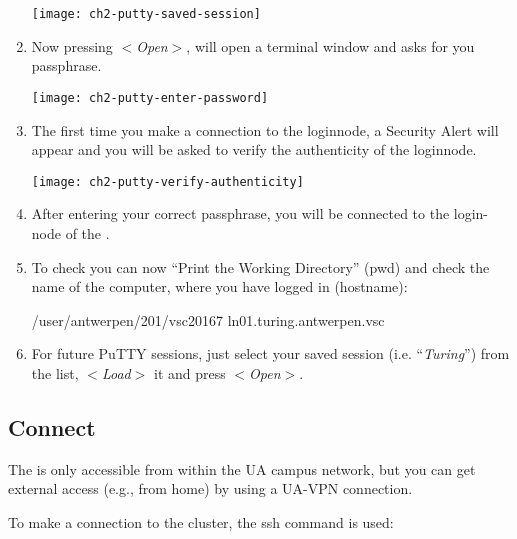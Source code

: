 \begin{enumerate}
  \texttt{[image: ch2-putty-saved-session]}

    \item  Now pressing $<$\emph{Open}$>$, will open a terminal window and
      asks for you passphrase.

  \texttt{[image: ch2-putty-enter-password]}

    \item  The first time you make a connection to the loginnode, a Security
      Alert will appear and you will be asked to verify the authenticity of the
      loginnode.

  \texttt{[image: ch2-putty-verify-authenticity]}

    \item  After entering your correct passphrase, you will be connected to the
      login-node of the \hpc.
    \item  To check you can now ``Print the Working Directory'' (pwd) and check
      the name of the computer, where you have logged in (hostname):

  \begin{prompt}
  /user/antwerpen/201/vsc20167
  ln01.turing.antwerpen.vsc
  \end{prompt}

    \item  For future PuTTY sessions, just select your saved session (i.e.
      ``\emph{Turing}'') from the list, $<$\emph{Load}$>$ it and press
      $<$\emph{Open}$>$.
  \end{enumerate}

\fi

\subsection{Connect}
\label{sec:connect}

The \hpc is only accessible from within the UA campus network, but you can
get external access (e.g., from home) by using a UA-VPN connection.

To make a connection to the \hpc cluster, the ssh command is used:

\begin{prompt}
\end{prompt}

